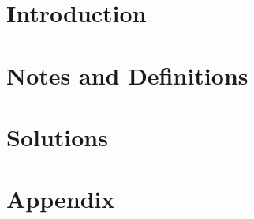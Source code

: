 \documentclass[12pt.fleqn]{article}
\begin{document}
\tableofcontents

\pagestyle{plain}

\section{Introduction}



\section{Notes and Definitions}





\section{Solutions}

% 


\section{Appendix}
\end{document}
